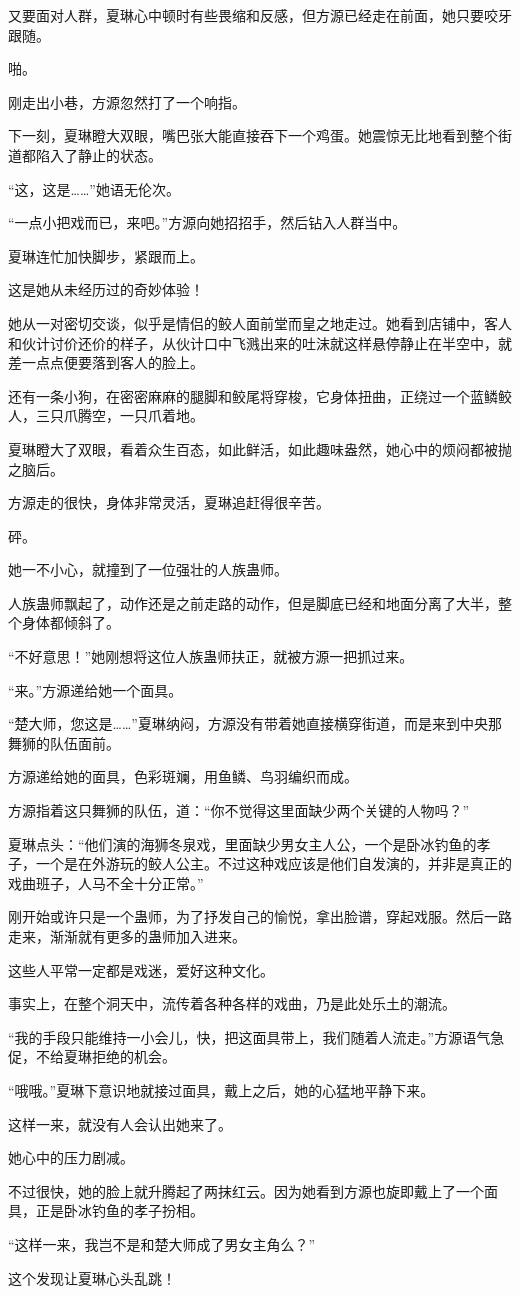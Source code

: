 \begin{this_body}
又要面对人群，夏琳心中顿时有些畏缩和反感，但方源已经走在前面，她只要咬牙跟随。

啪。

刚走出小巷，方源忽然打了一个响指。

下一刻，夏琳瞪大双眼，嘴巴张大能直接吞下一个鸡蛋。她震惊无比地看到整个街道都陷入了静止的状态。

“这，这是……”她语无伦次。

“一点小把戏而已，来吧。”方源向她招招手，然后钻入人群当中。

夏琳连忙加快脚步，紧跟而上。

这是她从未经历过的奇妙体验！

她从一对密切交谈，似乎是情侣的鲛人面前堂而皇之地走过。她看到店铺中，客人和伙计讨价还价的样子，从伙计口中飞溅出来的吐沫就这样悬停静止在半空中，就差一点点便要落到客人的脸上。

还有一条小狗，在密密麻麻的腿脚和鲛尾将穿梭，它身体扭曲，正绕过一个蓝鳞鲛人，三只爪腾空，一只爪着地。

夏琳瞪大了双眼，看着众生百态，如此鲜活，如此趣味盎然，她心中的烦闷都被抛之脑后。

方源走的很快，身体非常灵活，夏琳追赶得很辛苦。

砰。

她一不小心，就撞到了一位强壮的人族蛊师。

人族蛊师飘起了，动作还是之前走路的动作，但是脚底已经和地面分离了大半，整个身体都倾斜了。

“不好意思！”她刚想将这位人族蛊师扶正，就被方源一把抓过来。

“来。”方源递给她一个面具。

“楚大师，您这是……”夏琳纳闷，方源没有带着她直接横穿街道，而是来到中央那舞狮的队伍面前。

方源递给她的面具，色彩斑斓，用鱼鳞、鸟羽编织而成。

方源指着这只舞狮的队伍，道：“你不觉得这里面缺少两个关键的人物吗？”

夏琳点头：“他们演的海狮冬泉戏，里面缺少男女主人公，一个是卧冰钓鱼的孝子，一个是在外游玩的鲛人公主。不过这种戏应该是他们自发演的，并非是真正的戏曲班子，人马不全十分正常。”

刚开始或许只是一个蛊师，为了抒发自己的愉悦，拿出脸谱，穿起戏服。然后一路走来，渐渐就有更多的蛊师加入进来。

这些人平常一定都是戏迷，爱好这种文化。

事实上，在整个洞天中，流传着各种各样的戏曲，乃是此处乐土的潮流。

“我的手段只能维持一小会儿，快，把这面具带上，我们随着人流走。”方源语气急促，不给夏琳拒绝的机会。

“哦哦。”夏琳下意识地就接过面具，戴上之后，她的心猛地平静下来。

这样一来，就没有人会认出她来了。

她心中的压力剧减。

不过很快，她的脸上就升腾起了两抹红云。因为她看到方源也旋即戴上了一个面具，正是卧冰钓鱼的孝子扮相。

“这样一来，我岂不是和楚大师成了男女主角么？”

这个发现让夏琳心头乱跳！

\end{this_body}


